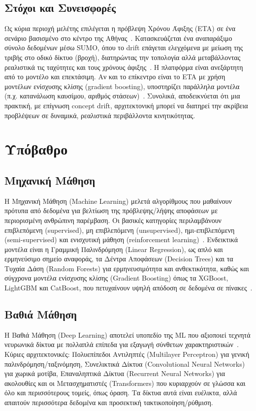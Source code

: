 \subsection*{Στόχοι και Συνεισφορές}
Ως κύρια περιοχή μελέτης επιλέγεται η πρόβλεψη Χρόνου Άφιξης (ETA) σε ένα σενάριο βασισμένο στο κέντρο της Αθήνας~\cite{abdi2021travel, arifi2024eta}.
Κατασκευάζεται ένα αναπαράξιμο σύνολο δεδομένων μέσω SUMO, όπου το drift επάγεται ελεγχόμενα με μείωση της τριβής στο οδικό δίκτυο (βροχή), διατηρώντας την τοπολογία αλλά μεταβάλλοντας ρεαλιστικά τις ταχύτητες και τους χρόνους άφιξης~\cite{krajzewicz2012recent, sumo2019friction}.
Η πλατφόρμα είναι ανεξάρτητη από το μοντέλο και επεκτάσιμη.
Αν και το επίκεντρο είναι το ETA με χρήση μοντέλων ενίσχυσης κλίσης (gradient boosting), υποστηρίζει παράλληλα μοντέλα (π.χ. κατανάλωση καυσίμου, αριθμός στάσεων)~\cite{angelis2025fuel, tzelepis2025stops}.
Συνολικά, αποδεικνύεται ότι μια πρακτική, με επίγνωση concept drift, αρχιτεκτονική μπορεί να διατηρεί την ακρίβεια προβλέψεων σε δυναμικά, ρεαλιστικά περιβάλλοντα κινητικότητας.

\section*{Υπόβαθρο}

\subsection*{Μηχανική Μάθηση}
Η Μηχανική Μάθηση (Machine Learning) μελετά αλγορίθμους που μαθαίνουν πρότυπα από δεδομένα για βελτίωση της πρόβλεψης/λήψης αποφάσεων με περιορισμένη ανθρώπινη παρέμβαση.
Οι βασικές κατηγορίες περιλαμβάνουν επιβλεπόμενη (supervised), μη επιβλεπόμενη (unsupervised), ημι-επιβλεπόμενη (semi-supervised) και ενισχυτική μάθηση (reinforcement learning)~\cite{shalev-shwartz2014understanding}.
Ενδεικτικά μοντέλα είναι η Γραμμική Παλινδρόμηση (Linear Regression), ως απλό και ερμηνεύσιμο σημείο αναφοράς, τα Δέντρα Αποφάσεων (Decision Trees) και τα Τυχαία Δάση (Random Forests) για ερμηνευσιμότητα και ανθεκτικότητα, καθώς και σύγχρονα μοντέλα ενίσχυσης κλίσης (Gradient Boosting) όπως τα XGBoost, LightGBM και CatBoost, που πετυχαίνουν υψηλή απόδοση σε δεδομένα σε πίνακες~\cite{sarker2021machine, chen2016xgboost, ke2017lightgbm, prokhorenkova2018catboost}.

\subsection*{Βαθιά Μάθηση}
Η Βαθιά Μάθηση (Deep Learning) αποτελεί υποπεδίο της ML που αξιοποιεί τεχνητά νευρωνικά δίκτυα με πολλαπλά επίπεδα για εξαγωγή σύνθετων χαρακτηριστικών~\cite{lecun2015deep}.
Κύριες αρχιτεκτονικές: Πολυεπίπεδοι Αντιληπτές (Multilayer Perceptron) για γενική παλινδρόμηση/ταξινόμηση, Συνελικτικά Δίκτυα (Convolutional Neural Networks) για χωρικά μοτίβα, Επαναληπτικά Δίκτυα (Recurrent Neural Networks) για ακολουθίες και οι Μετασχηματιστές (Transformers) που κυριαρχούν σε γλώσσα και όλο και περισσότερους τομείς, όπως όραση.
Τα δίκτυα αυτά είναι ευέλικτα, αλλά απαιτούν περισσότερα δεδομένα και προσεκτική τακτικοποίηση/ρύθμιση.

